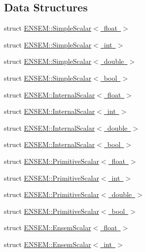 \subsection*{Data Structures}
\begin{DoxyCompactItemize}
\item 
struct \mbox{\hyperlink{structENSEM_1_1SimpleScalar_3_01float_01_4}{E\+N\+S\+E\+M\+::\+Simple\+Scalar$<$ float $>$}}
\item 
struct \mbox{\hyperlink{structENSEM_1_1SimpleScalar_3_01int_01_4}{E\+N\+S\+E\+M\+::\+Simple\+Scalar$<$ int $>$}}
\item 
struct \mbox{\hyperlink{structENSEM_1_1SimpleScalar_3_01double_01_4}{E\+N\+S\+E\+M\+::\+Simple\+Scalar$<$ double $>$}}
\item 
struct \mbox{\hyperlink{structENSEM_1_1SimpleScalar_3_01bool_01_4}{E\+N\+S\+E\+M\+::\+Simple\+Scalar$<$ bool $>$}}
\item 
struct \mbox{\hyperlink{structENSEM_1_1InternalScalar_3_01float_01_4}{E\+N\+S\+E\+M\+::\+Internal\+Scalar$<$ float $>$}}
\item 
struct \mbox{\hyperlink{structENSEM_1_1InternalScalar_3_01int_01_4}{E\+N\+S\+E\+M\+::\+Internal\+Scalar$<$ int $>$}}
\item 
struct \mbox{\hyperlink{structENSEM_1_1InternalScalar_3_01double_01_4}{E\+N\+S\+E\+M\+::\+Internal\+Scalar$<$ double $>$}}
\item 
struct \mbox{\hyperlink{structENSEM_1_1InternalScalar_3_01bool_01_4}{E\+N\+S\+E\+M\+::\+Internal\+Scalar$<$ bool $>$}}
\item 
struct \mbox{\hyperlink{structENSEM_1_1PrimitiveScalar_3_01float_01_4}{E\+N\+S\+E\+M\+::\+Primitive\+Scalar$<$ float $>$}}
\item 
struct \mbox{\hyperlink{structENSEM_1_1PrimitiveScalar_3_01int_01_4}{E\+N\+S\+E\+M\+::\+Primitive\+Scalar$<$ int $>$}}
\item 
struct \mbox{\hyperlink{structENSEM_1_1PrimitiveScalar_3_01double_01_4}{E\+N\+S\+E\+M\+::\+Primitive\+Scalar$<$ double $>$}}
\item 
struct \mbox{\hyperlink{structENSEM_1_1PrimitiveScalar_3_01bool_01_4}{E\+N\+S\+E\+M\+::\+Primitive\+Scalar$<$ bool $>$}}
\item 
struct \mbox{\hyperlink{structENSEM_1_1EnsemScalar_3_01float_01_4}{E\+N\+S\+E\+M\+::\+Ensem\+Scalar$<$ float $>$}}
\item 
struct \mbox{\hyperlink{structENSEM_1_1EnsemScalar_3_01int_01_4}{E\+N\+S\+E\+M\+::\+Ensem\+Scalar$<$ int $>$}}
\item 

\end{DoxyCompactItemize}
